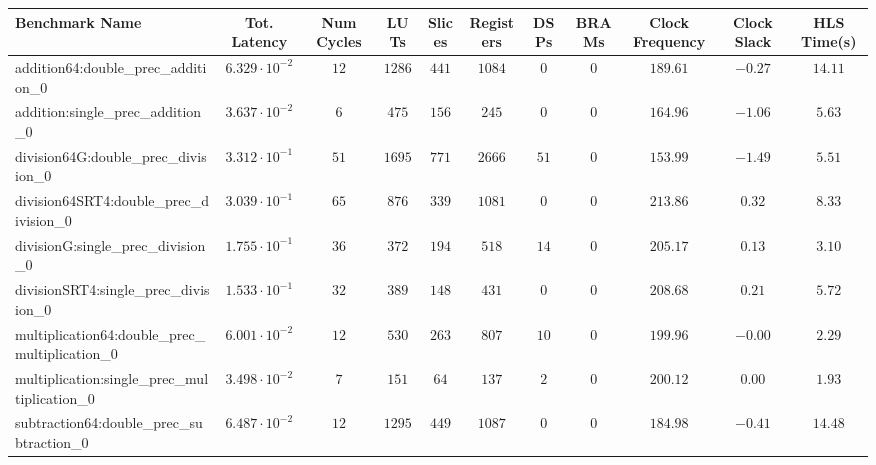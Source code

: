 \begin{tabular}{|l|c|c|c|c|c|c|c|c|c|c|}
\hline
Benchmark Name                                   & Tot. Latency            & Num Cycles & LUTs     & Slices   & Registers & DSPs   & BRAMs & Clock Frequency & Clock Slack & HLS Time(s) \\
\hline
addition64:double\_prec\_addition\_0             & $ 6.329 \cdot 10^{-2} $ & $ 12     $ & $ 1286 $ & $ 441  $ & $ 1084  $ & $ 0  $ & $ 0 $ & $ 189.61      $ & $ -0.27   $ & $ 14.11   $ \\
addition:single\_prec\_addition\_0               & $ 3.637 \cdot 10^{-2} $ & $ 6      $ & $ 475  $ & $ 156  $ & $ 245   $ & $ 0  $ & $ 0 $ & $ 164.96      $ & $ -1.06   $ & $ 5.63    $ \\
division64G:double\_prec\_division\_0            & $ 3.312 \cdot 10^{-1} $ & $ 51     $ & $ 1695 $ & $ 771  $ & $ 2666  $ & $ 51 $ & $ 0 $ & $ 153.99      $ & $ -1.49   $ & $ 5.51    $ \\
division64SRT4:double\_prec\_division\_0         & $ 3.039 \cdot 10^{-1} $ & $ 65     $ & $ 876  $ & $ 339  $ & $ 1081  $ & $ 0  $ & $ 0 $ & $ 213.86      $ & $ 0.32    $ & $ 8.33    $ \\
divisionG:single\_prec\_division\_0              & $ 1.755 \cdot 10^{-1} $ & $ 36     $ & $ 372  $ & $ 194  $ & $ 518   $ & $ 14 $ & $ 0 $ & $ 205.17      $ & $ 0.13    $ & $ 3.10    $ \\
divisionSRT4:single\_prec\_division\_0           & $ 1.533 \cdot 10^{-1} $ & $ 32     $ & $ 389  $ & $ 148  $ & $ 431   $ & $ 0  $ & $ 0 $ & $ 208.68      $ & $ 0.21    $ & $ 5.72    $ \\
multiplication64:double\_prec\_multiplication\_0 & $ 6.001 \cdot 10^{-2} $ & $ 12     $ & $ 530  $ & $ 263  $ & $ 807   $ & $ 10 $ & $ 0 $ & $ 199.96      $ & $ -0.00   $ & $ 2.29    $ \\
multiplication:single\_prec\_multiplication\_0   & $ 3.498 \cdot 10^{-2} $ & $ 7      $ & $ 151  $ & $ 64   $ & $ 137   $ & $ 2  $ & $ 0 $ & $ 200.12      $ & $ 0.00    $ & $ 1.93    $ \\
subtraction64:double\_prec\_subtraction\_0       & $ 6.487 \cdot 10^{-2} $ & $ 12     $ & $ 1295 $ & $ 449  $ & $ 1087  $ & $ 0  $ & $ 0 $ & $ 184.98      $ & $ -0.41   $ & $ 14.48   $ \\

\end{tabular}
